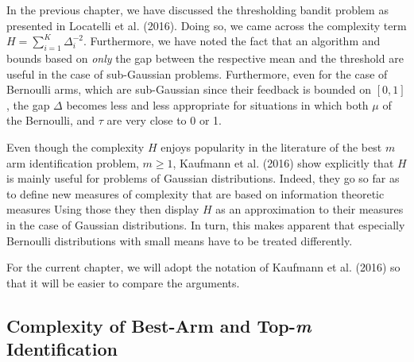 \documentclass[12pt,]{article}
\begin{document}
In the previous chapter, we have discussed the thresholding bandit
problem as presented in Locatelli et al. (2016). Doing so, we came
across the complexity term \(H = \sum_{i=1}^{K} \Delta_i^{-2}\).
Furthermore, we have noted the fact that an algorithm and bounds based
on \emph{only} the gap between the respective mean and the threshold are
useful in the case of sub-Gaussian problems. Furthermore, even for the
case of Bernoulli arms, which are sub-Gaussian since their feedback is
bounded on \([0,1]\), the gap \(\Delta\) becomes less and less
appropriate for situations in which both \(\mu\) of the Bernoulli, and
\(\tau\) are very close to 0 or 1.

Even though the complexity \(H\) enjoys popularity in the literature of
the best \(m\) arm identification problem, \(m \geq 1\), Kaufmann et al.
(2016) show explicitly that \(H\) is mainly useful for problems of
Gaussian distributions. Indeed, they go so far as to define new measures
of complexity that are based on information theoretic measures Using
those they then display \(H\) as an approximation to their measures in
the case of Gaussian distributions. In turn, this makes apparent that
especially Bernoulli distributions with small means have to be treated
differently.

For the current chapter, we will adopt the notation of Kaufmann et al.
(2016) so that it will be easier to compare the arguments.

\subsection{\texorpdfstring{Complexity of Best-Arm and Top-\emph{m}
Identification}{Complexity of Best-Arm and Top-m Identification}}\label{complexity-of-best-arm-and-top-m-identification}
\end{document}
